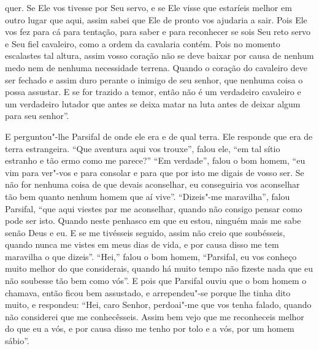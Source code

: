 quer. Se Ele vos tivesse por Seu servo, e se Ele visse que estaríeis melhor em
outro lugar que aqui, assim sabei que Ele de pronto vos ajudaria a sair. Pois
Ele vos fez para cá para tentação, para saber e para reconhecer se sois Seu
reto servo e Seu fiel cavaleiro, como a ordem da cavalaria contém. Pois no
momento escalastes tal altura, assim vosso coração não se deve baixar por causa
de nenhum medo nem de nenhuma necessidade terrena. Quando o coração do
cavaleiro deve ser fechado e assim duro perante o inimigo de seu senhor, que
nenhuma coisa o possa assustar. E se for trazido a temor, então não é um
verdadeiro cavaleiro e um verdadeiro lutador que antes se deixa matar na luta
antes de deixar algum para seu senhor”.  

E perguntou"-lhe Parsifal de onde ele era e de qual terra. Ele responde que
era de terra estrangeira. “Que aventura aqui vos trouxe”, falou ele, “em tal
sítio estranho e tão ermo como me parece?” “Em verdade”, falou o bom homem,
“eu vim para ver"-vos e para consolar e para que por isto me digais de vosso
ser. Se não for nenhuma coisa de que devais aconselhar, eu conseguiria vos
aconselhar tão bem quanto nenhum homem que aí vive”. “Dizeis"-me maravilha”,
falou Parsifal, “que aqui viestes par me aconselhar, quando não consigo pensar
como pode ser isto. Quando neste penhasco em que eu estou,
ninguém mais me sabe senão Deus e eu. E se me tivésseis seguido, assim não
creio que soubésseis, quando nunca me vistes em meus dias de vida, e por causa
disso me tem maravilha o que dizeis”. “Hei,” falou o bom homem, “Parsifal, eu
vos conheço muito melhor do que considerais, quando há muito tempo não fizeste
nada que eu não soubesse tão bem como vós”. E pois que Parsifal ouviu que o
bom homem o chamava, então ficou bem assustado, e arrependeu"-se porque lhe
tinha dito muito, e respondeu: “Hei, caro Senhor, perdoai"-me que vos tenha
falado, quando não considerei que me conhecêsseis. Assim bem vejo que me
reconheceis melhor do que eu a vós, e por causa disso me tenho por tolo e a
vós, por um homem sábio”.

